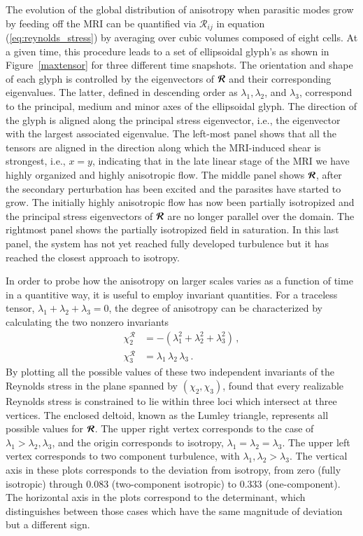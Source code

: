 \documentclass[]{emulateapj}
\newcommand\bb[1]{\mbox{\boldmath{$#1$}}}
\begin{document}
The evolution of the global distribution of anisotropy when parasitic
modes grow by feeding off the MRI can be quantified via
$\mathcal{R}_{ij}$ in equation (\ref{eq:reynolds_stress}) by averaging
over cubic volumes composed of eight cells. At a given time, this
procedure leads to a set of ellipsoidal glyph's as shown in
Figure~\ref{maxtensor} for three different time snapshots.  The
orientation and shape of each glyph is controlled by the eigenvectors
of $\bb{\mathcal{R}}$ and their corresponding eigenvalues. The latter,
defined in descending order as $\lambda_1,\lambda_2$, and $\lambda_3$,
correspond to the principal, medium and minor axes of the ellipsoidal
glyph. The direction of the glyph is aligned along the principal
stress eigenvector, i.e., the eigenvector with the largest associated eigenvalue.  
The left-most panel shows that all the tensors
are aligned in the direction along which the MRI-induced shear is
strongest, i.e., $x=y$, indicating that in the late linear stage of the MRI we have
highly organized and highly anisotropic flow. 
The middle panel shows $\bb{\mathcal{R}}$, after
the secondary perturbation has been excited and the parasites have
started to grow. The initially highly anisotropic flow has now been
partially isotropized and the principal stress eigenvectors of
$\bb{\mathcal{R}}$ are no longer parallel over the domain.  The
rightmost panel shows the partially isotropized field in saturation.
In this last panel, the system has not yet reached fully developed
turbulence but it has reached the closest approach to isotropy.


In order to probe how the anisotropy on larger scales varies as a function 
of time in a quantitive way, it is useful to employ invariant quantities. 
For a traceless tensor, $\lambda_1+\lambda_2+\lambda_3 = 0$, 
the degree of anisotropy can be characterized by calculating the two nonzero invariants 
\begin{align}
\chi^\mathcal{R}_2 &= - (\lambda_1^2+\lambda_2^2+\lambda_3^2) \,, \\
\chi^\mathcal{R}_3 &= \lambda_1 \, \lambda_2 \, \lambda_3 \,.
\end{align}
By plotting all the possible values of these two independent
invariants of the Reynolds stress in the plane spanned by
$(\chi_2,\chi_3)$, \cite{1977JFM....82..161L} found that every
realizable Reynolds stress is constrained to lie within three loci
which intersect at three vertices.  The enclosed deltoid, known as the
Lumley triangle, represents all possible values for
$\bb{\mathcal{R}}$.  The upper right vertex corresponds to the case of
$\lambda_1 > \lambda_2 , \lambda_3$, and the origin corresponds to
isotropy, $\lambda_1= \lambda_2 = \lambda_3$.  The upper left vertex
corresponds to two component turbulence, with  $\lambda_1 , \lambda_2 >
\lambda_3$. The vertical axis in these plots corresponds to the
deviation from isotropy, from zero (fully isotropic) through 0.083
(two-component isotropic) to 0.333 (one-component). The horizontal
axis in the plots correspond to the determinant, which distinguishes
between those cases which have the same magnitude of deviation but a
different sign.
\end{document}
